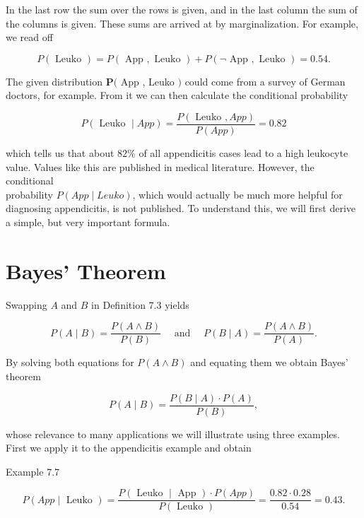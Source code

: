 \documentclass[10pt]{book}
\begin{document}
In the last row the sum over the rows is given, and in the last column the sum of the columns is given. These sums are arrived at by marginalization. For example, we read off

$$
P(\text { Leuko })=P(\text { App }, \text { Leuko })+P(\neg \text { App }, \text { Leuko })=0.54 .
$$

The given distribution $\boldsymbol{P}($ App , Leuko $)$ could come from a survey of German doctors, for example. From it we can then calculate the conditional probability

$$
P(\text { Leuko } \mid A p p)=\frac{P(\text { Leuko }, A p p)}{P(A p p)}=0.82
$$

which tells us that about $82 \%$ of all appendicitis cases lead to a high leukocyte value. Values like this are published in medical literature. However, the conditional\\
probability $P(A p p \mid L e u k o)$, which would actually be much more helpful for diagnosing appendicitis, is not published. To understand this, we will first derive a simple, but very important formula.

\section*{Bayes' Theorem}
Swapping $A$ and $B$ in Definition 7.3 yields

$$
P(A \mid B)=\frac{P(A \wedge B)}{P(B)} \quad \text { and } \quad P(B \mid A)=\frac{P(A \wedge B)}{P(A)} .
$$

By solving both equations for $P(A \wedge B)$ and equating them we obtain Bayes' theorem


\begin{equation*}
P(A \mid B)=\frac{P(B \mid A) \cdot P(A)}{P(B)}, \tag{7.2}
\end{equation*}


whose relevance to many applications we will illustrate using three examples. First we apply it to the appendicitis example and obtain

Example 7.7


\begin{equation*}
P(A p p \mid \text { Leuko })=\frac{P(\text { Leuko } \mid \text { App }) \cdot P(A p p)}{P(\text { Leuko })}=\frac{0.82 \cdot 0.28}{0.54}=0.43 . \tag{7.3}
\end{equation*}
\end{document}
